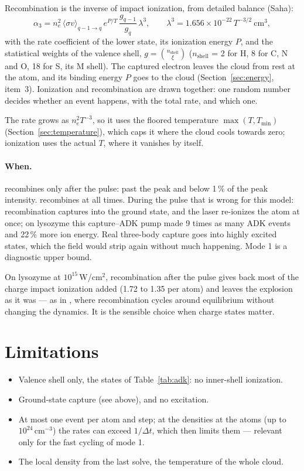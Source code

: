 Recombination is the inverse of impact ionization, from detailed balance (Saha):
\begin{equation}
  \alpha_3 = n_e^2\,\langle\sigma v\rangle_{q-1\to q}\,e^{P/T}\,\frac{g_{q-1}}{g_q}\,\lambda^3,\qquad
  \lambda^3 = 1.656\times10^{-22}\,T^{-3/2}\ \mathrm{cm^3},
\end{equation}
with the rate coefficient of the lower state, its ionization energy $P$, and the statistical weights of the valence
shell, $g = \binom{n_{\mathrm{shell}}}{\xi}$ ($n_{\mathrm{shell}}$ = 2 for H, 8 for C, N and O, 18 for S, its M shell).
The captured electron leaves the cloud from rest at the atom, and its binding energy $P$ goes to the cloud
(Section~\ref{sec:energy}, item~3).
Ionization and recombination are drawn together: one random number decides whether an event happens, with the total rate,
and which one.

The rate grows as $n_e^2T^{-3}$, so it uses the floored temperature $\max(T,T_{\min})$ (Section~\ref{sec:temperature}),
which caps it where the cloud cools towards zero; ionization uses the actual $T$, where it vanishes by itself.

\paragraph{When.}
 recombines only after the pulse: past the peak and below 1\,\% of the peak
intensity.
 recombines at all times.
During the pulse that is wrong for this model: recombination captures into the ground state, and the laser re-ionizes
the atom at once; on lysozyme this capture--ADK pump made 9 times as many ADK events and 22\,\% more ion energy.
Real three-body capture goes into highly excited states, which the field would strip again without much happening.
Mode 1 is a diagnostic upper bound.

On lysozyme at $10^{15}$\,W/cm$^2$, recombination after the pulse gives back most of the charge impact ionization added
(1.72 to 1.35 per atom) and leaves the explosion as it was --- as in , where recombination cycles around
equilibrium without changing the dynamics.
It is the sensible choice when charge states matter.

\section{Limitations}

\begin{itemize}
  \item Valence shell only, the states of Table~\ref{tab:adk}: no inner-shell ionization.
  \item Ground-state capture (see above), and no excitation.
  \item At most one event per atom and step; at the densities at the atoms (up to $10^{24}$\,cm$^{-3}$) the rates can
    exceed $1/\Delta t$, which then limits them --- relevant only for the fast cycling of mode 1.
  \item The local density from the last solve, the temperature of the whole cloud.
\end{itemize}
